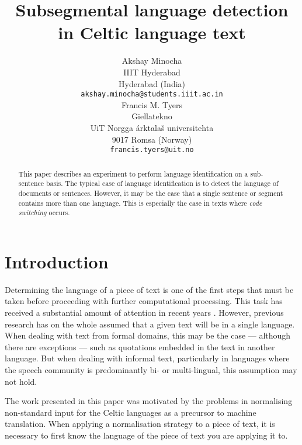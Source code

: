 \documentclass[11pt]{article}
\title{Subsegmental language detection in Celtic language text}
\author{}
\author{Akshay Minocha \\
  IIIT Hyderabad  \\
  Hyderabad (India) \\
  {\small {\tt akshay.minocha@students.iiit.ac.in}} \\\And
  Francis M. Tyers \\
  Giellatekno \\ %
  UiT Norgga \'arktala\v{s} universitehta  \\
  9017 Romsa (Norway) \\
  {\small {\tt francis.tyers@uit.no}} \\}
\date{}
\begin{document}
\maketitle
\begin{abstract}
  This paper describes an experiment to perform language identification on a sub-sentence basis. The typical
  case of language identification is to detect the language of documents or sentences. However, it may be the 
  case that a single sentence or segment contains more than one language. This is especially the case in texts
  where \emph{code switching} occurs. 

\end{abstract}

\section{Introduction}
\vspace{-0.132cm}
\label{intro}
Determining the language of a piece of text is one of the first steps that must be taken
before proceeding with further computational processing. This task has received a substantial amount of
attention in recent years \cite{cavnar1994n,lui2012langid}. However, previous research has on the whole assumed
that a given text will be in a single language. When dealing with text from formal domains,
this may be the case --- although there are exceptions --- such as quotations embedded in
the text in another language. But when dealing with informal text, particularly in languages
where the speech community is predominantly bi- or multi-lingual, this assumption may not hold.

The work presented in this paper was motivated by the problems in normalising non-standard input
for the Celtic languages as a precursor to machine translation. When applying a normalisation 
strategy to a piece of text, it is necessary to first know the language of the piece of text you are applying it to.
\end{document}
